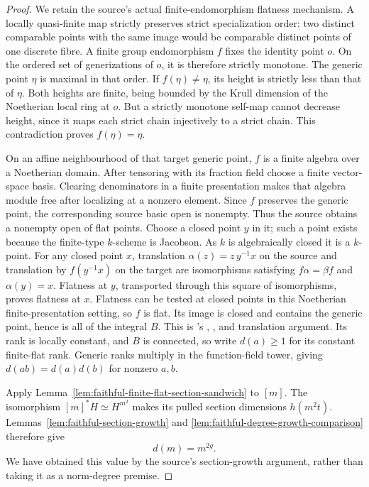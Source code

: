 \begin{proof}
We retain the source's actual finite-endomorphism flatness
mechanism.  A locally quasi-finite map strictly preserves
strict specialization order: two distinct comparable points
with the same image would be comparable distinct points
of one discrete fibre.  A finite group endomorphism \(f\)
fixes the identity point \(o\).
On the ordered set of generizations of \(o\), it is therefore
strictly monotone.
The generic point \(\eta\) is maximal in that order.
If \(f(\eta)\ne\eta\), its height is strictly less than
that of \(\eta\).  Both heights are finite, being bounded
by the Krull dimension of the Noetherian local ring at \(o\).
But a strictly monotone self-map cannot decrease height,
since it maps each strict chain injectively to a strict chain.
This contradiction proves \(f(\eta)=\eta\).

On an affine neighbourhood of that target generic point,
\(f\) is a finite algebra over a Noetherian domain.
After tensoring with its fraction field choose a finite
vector-space basis.  Clearing denominators in a finite
presentation makes that algebra module free after
localizing at a nonzero element.
Since \(f\) preserves the generic point, the corresponding
source basic open is nonempty.
Thus the source obtains a nonempty open of flat points.
Choose a closed point \(y\) in it; such a point exists
because the finite-type \(k\)-scheme is Jacobson.
As \(k\) is algebraically closed it is a \(k\)-point.
For any closed point \(x\), translation
\(\alpha(z)=z\,y^{-1}x\) on the source and translation by
\(f(y^{-1}x)\) on the target are isomorphisms satisfying
\(f\alpha=\beta f\) and \(\alpha(y)=x\).
Flatness at \(y\), transported through this square of
isomorphisms, proves flatness at \(x\).
Flatness can be tested at closed points in this
Noetherian finite-presentation setting, so \(f\) is flat.
Its image is closed and contains the generic point, hence
is all of the integral \(B\).
This is 's
,
, and translation argument.
Its rank is locally constant, and \(B\) is connected, so
write \(d(a)\ge1\) for its constant finite-flat rank.
Generic ranks multiply in the function-field tower, giving
\(d(ab)=d(a)d(b)\) for nonzero \(a,b\).

Apply Lemma~\ref{lem:faithful-finite-flat-section-sandwich}
to \([m]\).
The isomorphism \([m]^*H\simeq H^{m^2}\) makes its pulled
section dimensions \(h(m^2t)\).
Lemmas~\ref{lem:faithful-section-growth} and
\ref{lem:faithful-degree-growth-comparison} therefore give
\[
                               d(m)=m^{2g}.
 \tag{DG8}\label{eq:faithful-integer-multiplication-degree}
\]
We have obtained this value by the source's section-growth
argument, rather than taking it as a norm-degree premise.


\end{proof}
